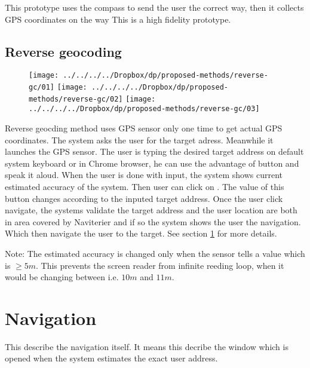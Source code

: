 		This prototype uses the compass to send the user the correct way, then it collects GPS coordinates on the way
		This is a high fidelity prototype.
		\subsection{Reverse geocoding}
		
		\begin{figure}[!htb]
			\texttt{[image: ../../../../Dropbox/dp/proposed-methods/reverse-gc/01]}
			\endminipage\hfill
			\texttt{[image: ../../../../Dropbox/dp/proposed-methods/reverse-gc/02]}
			\endminipage\hfill
			\texttt{[image: ../../../../Dropbox/dp/proposed-methods/reverse-gc/03]}
			\endminipage
		\end{figure}
		
		Reverse geocding method uses GPS sensor only one time to get actual GPS coordinates. 
		The system asks the user for the target adress. Meanwhile it launches the GPS sensor.
		The user is typing the desired target address on default system keyboard or in Chrome browser, he can use the advantage of button  and speak it aloud.
		When the user is done with input, the system shows current estimated accuracy of the system.
		Then user can click on . The value of this button changes according to the inputed target address.
		Once the user click navigate, the systems validate the target address and the user location are both in area covered by Naviterier and if so the system shows the user the navigation. Which then navigate the user to the target. See section \ref{sec:navifation} for more details.
		
		Note: The estimated accuracy is changed only when the sensor tells a value which is $\geq 5m$. This prevents the screen reader from infinite reeding loop, when it would be changing between i.e. $10m$ and $11m$. 
		\section{Navigation}
		\label{sec:navifation}
		This describe the navigation itself. It means this decribe the window which is opened when the system estimates the exact user address.

		
		
				
	